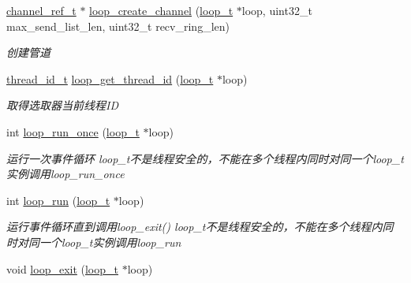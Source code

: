 \begin{DoxyCompactItemize}
\hyperlink{a00047_a151271c9d188ef28d4d24bb81dcc1263_a151271c9d188ef28d4d24bb81dcc1263}{channel\+\_\+ref\+\_\+t} $\ast$ \hyperlink{a00094_gab5b73ea9a0347b431f93ebf30ecd05b5_gab5b73ea9a0347b431f93ebf30ecd05b5}{loop\+\_\+create\+\_\+channel} (\hyperlink{a00047_a9c3ad1cd2de83e09f3a7b59fa82c94ee_a9c3ad1cd2de83e09f3a7b59fa82c94ee}{loop\+\_\+t} $\ast$loop, uint32\+\_\+t max\+\_\+send\+\_\+list\+\_\+len, uint32\+\_\+t recv\+\_\+ring\+\_\+len)
\begin{DoxyCompactList}\small\item\em 创建管道 \end{DoxyCompactList}\item 
\hyperlink{a00047_ad0ada5642d10ce71bdd90816182f9b79_ad0ada5642d10ce71bdd90816182f9b79}{thread\+\_\+id\+\_\+t} \hyperlink{a00062_a1a9b3ef7cb2655dbabeabeeae2f8f299_a1a9b3ef7cb2655dbabeabeeae2f8f299}{loop\+\_\+get\+\_\+thread\+\_\+id} (\hyperlink{a00047_a9c3ad1cd2de83e09f3a7b59fa82c94ee_a9c3ad1cd2de83e09f3a7b59fa82c94ee}{loop\+\_\+t} $\ast$loop)
\begin{DoxyCompactList}\small\item\em 取得选取器当前线程\+I\+D \end{DoxyCompactList}\item 
int \hyperlink{a00094_ga2f1994d76e46cf4855ac955ccd41d9ef_ga2f1994d76e46cf4855ac955ccd41d9ef}{loop\+\_\+run\+\_\+once} (\hyperlink{a00047_a9c3ad1cd2de83e09f3a7b59fa82c94ee_a9c3ad1cd2de83e09f3a7b59fa82c94ee}{loop\+\_\+t} $\ast$loop)
\begin{DoxyCompactList}\small\item\em 运行一次事件循环 loop\+\_\+t不是线程安全的，不能在多个线程内同时对同一个loop\+\_\+t实例调用loop\+\_\+run\+\_\+once \end{DoxyCompactList}\item 
int \hyperlink{a00094_ga8eb0f6c8d398c70fc5ca2292664a1187_ga8eb0f6c8d398c70fc5ca2292664a1187}{loop\+\_\+run} (\hyperlink{a00047_a9c3ad1cd2de83e09f3a7b59fa82c94ee_a9c3ad1cd2de83e09f3a7b59fa82c94ee}{loop\+\_\+t} $\ast$loop)
\begin{DoxyCompactList}\small\item\em 运行事件循环直到调用loop\+\_\+exit() loop\+\_\+t不是线程安全的，不能在多个线程内同时对同一个loop\+\_\+t实例调用loop\+\_\+run \end{DoxyCompactList}\item 
void \hyperlink{a00094_ga898c7e8ef4ff2f360a32454b2b1013de_ga898c7e8ef4ff2f360a32454b2b1013de}{loop\+\_\+exit} (\hyperlink{a00047_a9c3ad1cd2de83e09f3a7b59fa82c94ee_a9c3ad1cd2de83e09f3a7b59fa82c94ee}{loop\+\_\+t} $\ast$loop)

\end{DoxyCompactItemize}
